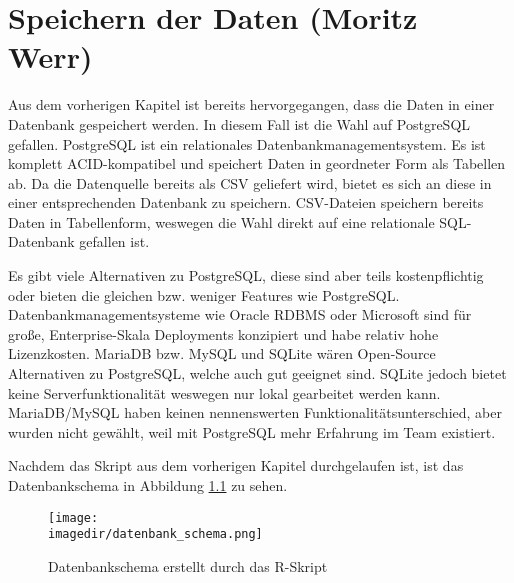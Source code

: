 \chapter{Speichern der Daten (Moritz Werr)}

Aus dem vorherigen Kapitel ist bereits hervorgegangen, dass die Daten in einer Datenbank gespeichert werden.
In diesem Fall ist die Wahl auf PostgreSQL gefallen.
PostgreSQL ist ein relationales Datenbankmanagementsystem. Es ist komplett ACID-kompatibel und speichert Daten in geordneter Form als Tabellen ab.
Da die Datenquelle bereits als CSV geliefert wird, bietet es sich an diese in einer entsprechenden Datenbank zu speichern.
CSV-Dateien speichern bereits Daten in Tabellenform, weswegen die Wahl direkt auf eine relationale SQL-Datenbank gefallen ist.

Es gibt viele Alternativen zu PostgreSQL, diese sind aber teils kostenpflichtig oder bieten die gleichen bzw. weniger Features wie PostgreSQL.
Datenbankmanagementsysteme wie Oracle RDBMS oder Microsoft sind für große, Enterprise-Skala Deployments konzipiert und habe relativ hohe Lizenzkosten.
MariaDB bzw. MySQL und SQLite wären Open-Source Alternativen zu PostgreSQL, welche auch gut geeignet sind.
SQLite jedoch bietet keine Serverfunktionalität weswegen nur lokal gearbeitet werden kann.
MariaDB/MySQL haben keinen nennenswerten Funktionalitätsunterschied, aber wurden nicht gewählt, weil mit PostgreSQL mehr Erfahrung im Team existiert.

Nachdem das Skript aus dem vorherigen Kapitel durchgelaufen ist, ist das Datenbankschema in Abbildung \ref{fig:datenbankschema} zu sehen.

\begin{figure}
	\centering 
	\texttt{[image: \\imagedir/datenbank\_schema.png]} 
	\captionsetup{format=hang}
	\caption[Datenbankschema]{\label{fig:datenbankschema}Datenbankschema erstellt durch das R-Skript}
\end{figure}